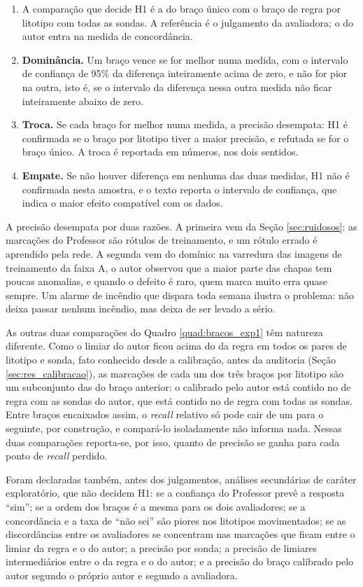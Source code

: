 \begin{enumerate}
  \item A comparação que decide H1 é a do braço único com o braço de regra por litotipo com todas as sondas. A referência é o julgamento da avaliadora; o do autor entra na medida de concordância.
  \item \textbf{Dominância.} Um braço vence se for melhor numa medida, com o intervalo de confiança de 95\% da diferença inteiramente acima de zero, e não for pior na outra, isto é, se o intervalo da diferença nessa outra medida não ficar inteiramente abaixo de zero.
  \item \textbf{Troca.} Se cada braço for melhor numa medida, a precisão desempata: H1 é confirmada se o braço por litotipo tiver a maior precisão, e refutada se for o braço único. A troca é reportada em números, nos dois sentidos.
  \item \textbf{Empate.} Se não houver diferença em nenhuma das duas medidas, H1 não é confirmada nesta amostra, e o texto reporta o intervalo de confiança, que indica o maior efeito compatível com os dados.
\end{enumerate}

A precisão desempata por duas razões. A primeira vem da Seção \ref{sec:ruidosos}: as marcações do Professor são rótulos de treinamento, e um rótulo errado é aprendido pela rede. A segunda vem do domínio: na varredura das imagens de treinamento da faixa A, o autor observou que a maior parte das chapas tem poucas anomalias, e quando o defeito é raro, quem marca muito erra quase sempre. Um alarme de incêndio que dispara toda semana ilustra o problema: não deixa passar nenhum incêndio, mas deixa de ser levado a sério.

As outras duas comparações do Quadro \ref{quad:bracos_exp1} têm natureza diferente. Como o limiar do autor ficou acima do da regra em todos os pares de litotipo e sonda, fato conhecido desde a calibração, antes da auditoria (Seção \ref{sec:res_calibracao}), as marcações de cada um dos três braços por litotipo são um subconjunto das do braço anterior: o calibrado pelo autor está contido no de regra com as sondas do autor, que está contido no de regra com todas as sondas. Entre braços encaixados assim, o \textit{recall} relativo só pode cair de um para o seguinte, por construção, e compará-lo isoladamente não informa nada. Nessas duas comparações reporta-se, por isso, quanto de precisão se ganha para cada ponto de \textit{recall} perdido.

Foram declaradas também, antes dos julgamentos, análises secundárias de caráter exploratório, que não decidem H1: se a confiança do Professor prevê a resposta ``sim''; se a ordem dos braços é a mesma para os dois avaliadores; se a concordância e a taxa de ``não sei'' são piores nos litotipos movimentados; se as discordâncias entre os avaliadores se concentram nas marcações que ficam entre o limiar da regra e o do autor; a precisão por sonda; a precisão de limiares intermediários entre o da regra e o do autor; e a precisão do braço calibrado pelo autor segundo o próprio autor e segundo a avaliadora.

